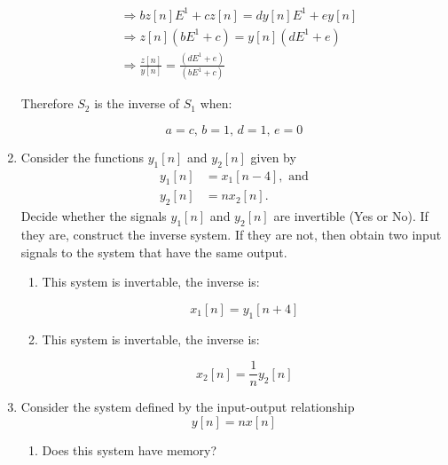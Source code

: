 \documentclass{article}
\begin{document}
\begin{enumerate}
\begin{align}
        &\Rightarrow bz[n]E^1+cz[n] = dy[n]E^1+ey[n]\\
        &\Rightarrow z[n](bE^1+ c) = y[n](dE^1+e)\\
        &\Rightarrow \frac{z[n]}{y[n]}=\frac{(dE^1+e)}{(bE^1+ c)}
    \end{align}
    \begin{center}
        Therefore $S_2$ is the inverse of $S_1$ when:
    \end{center}
    \begin{equation}
        \boxed{a = c\text{, }b = 1\text{, }d = 1\text{, }e =0}
    \end{equation}
    \newpage
    \item Consider the functions $y_1[n]$ and $y_2[n]$ given by
    \begin{align}
        y_1[n] &= x_1[n-4], \text{ and}\\
        y_2[n] &= nx_2[n].
    \end{align}
    Decide whether the signals $y_1[n]$ and $y_2[n]$ are invertible (Yes or No). If they are, construct the inverse system. If they are not, then obtain two input signals to the system that have the same output.
    \begin{enumerate}
        \item
        \begin{center}
            This system is invertable, the inverse is:
        \end{center}
        \begin{equation}
            \boxed{x_1[n] = y_1[n+4]}
        \end{equation}
        \item 
        \begin{center}
            This system is invertable, the inverse is:
        \end{center}
        \begin{equation}
            \boxed{x_2[n] = \frac{1}{n} y_2[n]}
        \end{equation}
    \end{enumerate}
    \newpage
    \item Consider the system defined by the input-output relationship
    \begin{equation}
        y[n] = nx[n]
    \end{equation}
    \begin{enumerate}
        \item Does this system have memory?
        \begin{center}

\end{center}
\end{enumerate}
\end{enumerate}
\end{document}
